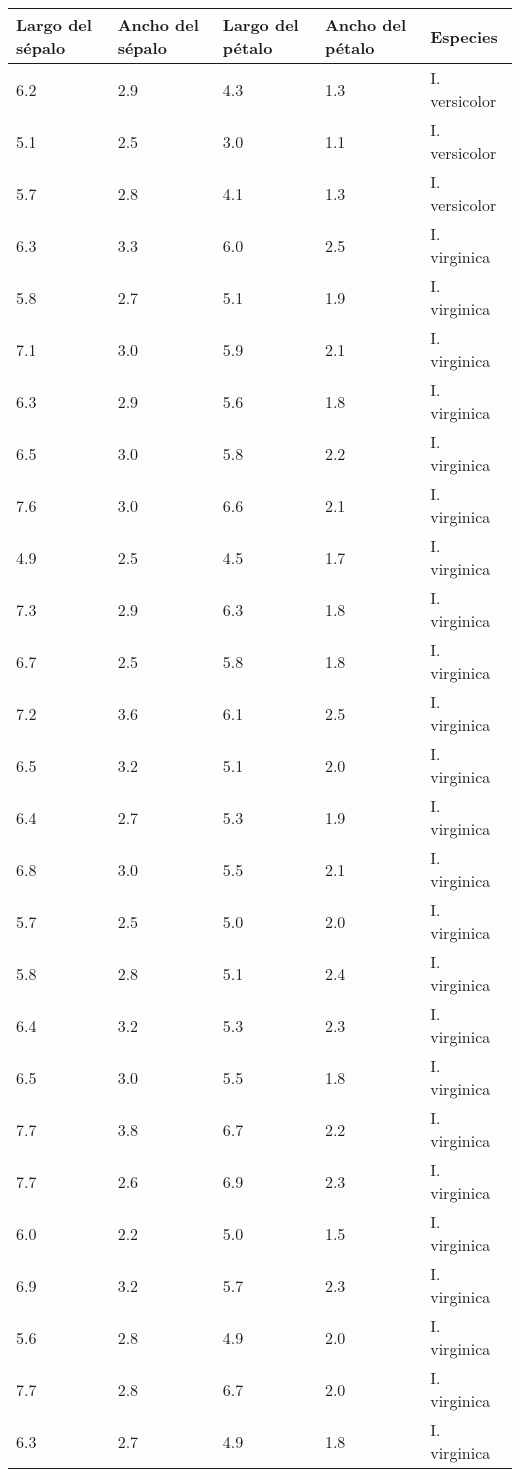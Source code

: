\begin{appendices}
\begin{center}
\begin{tabular}{|p{2cm}|p{2cm}|p{2cm}|p{2cm}|p{2cm}|}
\hline
Largo del sépalo & Ancho del sépalo & Largo del pétalo & Ancho del pétalo & Especies \\
\hline
6.2	& 2.9 & 4.3	& 1.3 & I. versicolor\\
\hline
5.1	& 2.5 & 3.0	& 1.1 & I. versicolor\\
\hline
5.7	& 2.8 & 4.1	& 1.3 & I. versicolor\\
\hline
6.3	& 3.3 & 6.0	& 2.5 & I. virginica\\
\hline
5.8	& 2.7 & 5.1	& 1.9 & I. virginica\\
\hline
7.1	& 3.0 & 5.9	& 2.1 & I. virginica\\
\hline
6.3	& 2.9 & 5.6	& 1.8 & I. virginica\\
\hline
6.5	& 3.0 & 5.8	& 2.2 & I. virginica\\
\hline
7.6	& 3.0 & 6.6	& 2.1 & I. virginica\\
\hline
4.9	& 2.5 & 4.5	& 1.7 & I. virginica\\
\hline
7.3	& 2.9 & 6.3	& 1.8 & I. virginica\\
\hline
6.7	& 2.5 & 5.8	& 1.8 & I. virginica\\
\hline
7.2	& 3.6 & 6.1	& 2.5 & I. virginica\\
\hline
6.5	& 3.2 & 5.1	& 2.0 & I. virginica\\
\hline
6.4	& 2.7 & 5.3	& 1.9 & I. virginica\\
\hline
6.8	& 3.0 & 5.5	& 2.1 & I. virginica\\
\hline
5.7	& 2.5 & 5.0	& 2.0 & I. virginica\\
\hline
5.8	& 2.8 & 5.1	& 2.4 & I. virginica\\
\hline
6.4	& 3.2 & 5.3	& 2.3 & I. virginica\\
\hline
6.5	& 3.0 & 5.5	& 1.8 & I. virginica\\
\hline
7.7	& 3.8 & 6.7	& 2.2 & I. virginica\\
\hline
7.7	& 2.6 & 6.9	& 2.3 & I. virginica\\
\hline
6.0	& 2.2 & 5.0	& 1.5 & I. virginica\\
\hline
6.9	& 3.2 & 5.7	& 2.3 & I. virginica\\
\hline
5.6	& 2.8 & 4.9	& 2.0 & I. virginica\\
\hline
7.7	& 2.8 & 6.7	& 2.0 & I. virginica\\
\hline
6.3	& 2.7 & 4.9	& 1.8 & I. virginica\\

\end{tabular}
\end{center}
\end{appendices}
